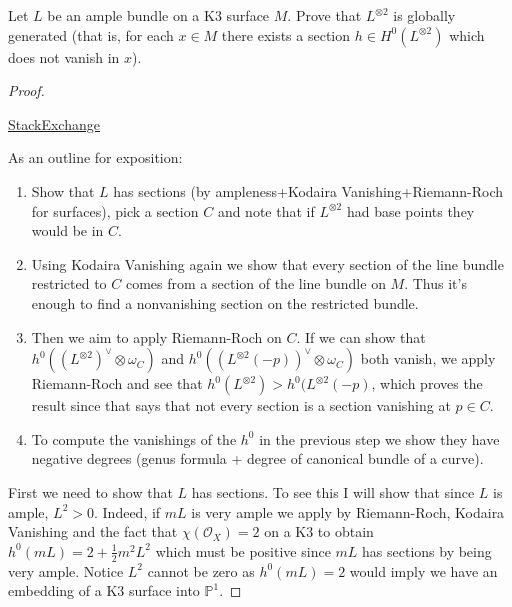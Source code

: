 \documentclass{book}
\begin{document}
\begin{exercise}
\label{exercise-l-ample-impli-lotim-globa}
Let $L$ be an ample bundle on a K3 surface
$M$.
Prove that $L^{\otimes 2}$ is
globally generated
(that is, for each $x \in M$ there exists a
section $h \in
H^{0}(L^{\otimes 2})$ which does not vanish
in $x$).
\end{exercise}

\begin{proof}
\begin{reference}
\href{https://math.stackexchange.com/%
questions/5081481/
ample-line-bundle-on-a-k3-surface-implies-l-
otimes-2-is-base-point-free/
5081492?noredirect=1#comment10928708_5081492}
{StackExchange}
\end{reference}
As an outline for exposition:
\begin{enumerate}
\item Show that $L$ has sections
(by ampleness+Kodaira Vanishing+Riemann-Roch
for surfaces),
pick a section $C$ and note that if
$L^{\otimes2}$ had base points they would be
in $C$.

\item  Using Kodaira Vanishing again we show
that every section of the line bundle
restricted to $C$
comes from a section of the line bundle on
$M$.
Thus it's enough to find a nonvanishing
section on the restricted bundle.

\item Then we aim to apply Riemann-Roch on
$C$.
If we can show that $h^0((L^{\otimes 2})^\vee
\otimes \omega_C)$
and $h^0((L^{\otimes 2}(-p))^\vee \otimes
\omega_C)$
both vanish, we apply Riemann-Roch and see
that
$h^0(L^{\otimes 2})> h^0(L^{\otimes 2}(-p)$,
which proves the result since that says
that not every section is a section vanishing
at $p \in C$.

\item To compute the vanishings of the $h^0$
in the previous step we show they have
negative degrees
(genus formula + degree of canonical bundle
of a curve).
\end{enumerate}

First we need to show that $L$ has sections.
To see this I will show that since $L$ is
ample, $L^2>0$. Indeed, if $mL$ is very ample
we apply by Riemann-Roch, Kodaira Vanishing
and the fact that $\chi(\mathcal{O}_X)=2$ on
a K3 to obtain $h^0(mL)=2+\frac{1}{2}m^2L^2$
which must be positive since $mL$ has
sections by being very ample. Notice $L^2$
cannot be zero as $h^0(mL)=2$ would imply we
have an embedding of a K3 surface into
$\mathbb{P}^1$.


\end{proof}
\end{document}
